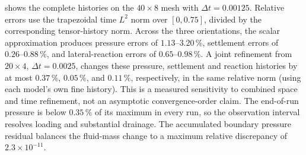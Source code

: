 shows the complete histories on the
\(40\times8\) mesh with \(\Delta t=0.00125\). Relative errors use the
trapezoidal time \(L^2\) norm over \([0,0.75]\), divided by the corresponding
tensor-history norm. Across the three orientations, the scalar approximation
produces pressure errors of \(1.13\text{--}3.20\,\%\), settlement errors of
\(0.26\text{--}0.88\,\%\), and lateral-reaction errors of \(0.65\text{--}0.98\,\%\).
A joint refinement from \(20\times4\), \(\Delta t=0.0025\), changes these
pressure, settlement and reaction histories by at most
\(0.37\,\%\), \(0.05\,\%\), and \(0.11\,\%\), respectively,
in the same relative norm (using each model's own fine history). This is a measured sensitivity to combined
space and time refinement, not an asymptotic convergence-order claim.
The end-of-run pressure is below \(0.35\,\%\) of its maximum in every
run, so the observation interval resolves loading and substantial drainage.
The accumulated boundary pressure residual balances the fluid-mass change
to a maximum relative discrepancy of \(2.3\times10^{-11}\).
